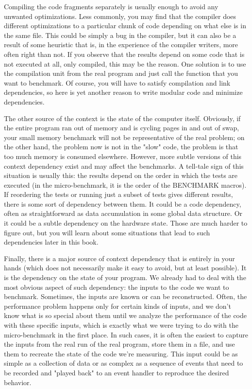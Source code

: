 Compiling the code fragments separately is usually enough to avoid any unwanted optimizations. Less commonly, you may find that the compiler does different optimizations to a particular chunk of code depending on what else is in the same file. This could be simply a bug in the compiler, but it can also be a result of some heuristic that is, in the experience of the compiler writers, more often right than not. If you observe that the results depend on some code that is not executed at all, only compiled, this may be the reason. One solution is to use the compilation unit from the real program and just call the function that you want to benchmark. Of course, you will have to satisfy compilation and link dependencies, so here is yet another reason to write modular code and minimize dependencies.

The other source of the context is the state of the computer itself. Obviously, if the entire program ran out of memory and is cycling pages in and out of swap, your small memory benchmark will not be representative of the real problem; on the other hand, the problem now is not in the "slow" code, the problem is that too much memory is consumed elsewhere. However, more subtle versions of this context dependency exist and may affect the benchmarks. A tell-tale sign of this situation is usually this: the results depend on the order in which the tests are executed (in the micro-benchmark, it is the order of the BENCHMARK macros). If reordering the tests or running just a subset of tests gives different results, there is some sort of dependency between them. It could be a code dependency, often as straightforward as data accumulation in some global data structure. Or it could be a subtle dependency on the hardware state. Those are much harder to figure out, but you will learn about some situations that lead to such dependencies later in this book.

Finally, there is a major source of context dependency that is entirely in your hands (which does not necessarily make it easy to avoid, but at least possible). It is the dependency on the state of your program. We already had to deal with the most obvious aspect of such dependency: the inputs to the code we want to benchmark. Sometimes, the inputs are known or can be reconstructed. Often, the performance problem happens only for certain kinds of inputs, and we don't know what is so special about them until we analyze the performance of the code with these specific inputs, which is exactly what we were trying to do with the micro-benchmark in the first place. In such cases, it is often the easiest to capture the inputs from the real run of the real program, store them in a file, and use them to recreate the state of the code we're measuring. This input could be as simple as a collection of data or as complex as a sequence of events that need to be recorded and "played back" to an event handler to reproduce the desired behavior.


